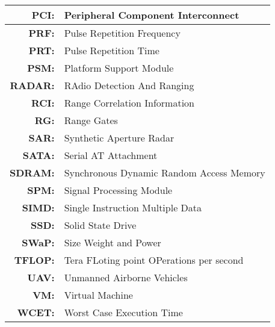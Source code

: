 \begin{center}
\begin{longtable}{|>{\bfseries}rl|}
PCI: & Peripheral Component Interconnect \\ \hline
PRF: & Pulse Repetition Frequency  \\ \hline
PRT: & Pulse Repetition Time \\ \hline
PSM: & Platform Support Module \\ \hline
RADAR: & RAdio Detection And Ranging \\ \hline 
RCI: & Range Correlation Information \\ \hline
RG: & Range Gates \\ \hline
SAR: & Synthetic Aperture Radar \\ \hline
SATA: & Serial AT Attachment \\ \hline
SDRAM: & Synchronous Dynamic Random Access Memory  \\ \hline
SPM: & Signal Processing Module \\ \hline
SIMD: & Single Instruction Multiple Data \\ \hline
SSD: & Solid State Drive \\ \hline
SWaP: & Size Weight and Power \\ \hline
TFLOP: & Tera FLoting point OPerations per second \\ \hline
UAV: & Unmanned Airborne Vehicles \\ \hline 
VM: & Virtual Machine \\ \hline
WCET: &  Worst Case Execution Time \\ \hline

\end{longtable}
\end{center}

